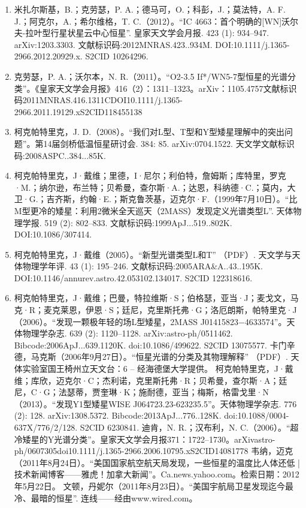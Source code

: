 \begin{enumerate}
\item 米扎尔斯基，B.；克劳瑟，P. A.；德马可，O.；科彭，J.；莫法特，A. F. J.；阿克尔，A.；希尔维格，T. C.（2012）。“IC 4663：首个明确的[WN]沃尔夫-拉叶型行星状星云中心恒星”. 皇家天文学会月报. 423 (1): 934–947. arXiv:1203.3303. 文献标识码:2012MNRAS.423..934M. DOI:10.1111/j.1365-2966.2012.20929.x. S2CID 10264296.
\item 克劳瑟，P. A.；沃尔本，N. R.（2011）。“O2-3.5 If*/WN5-7型恒星的光谱分类”。《皇家天文学会月报》416（2）：1311–1323。arXiv：1105.4757文献标识码2011MNRAS.416.1311CDOI10.1111/j.1365-2966.2011.19129.xS2CID118455138
\item 柯克帕特里克，J. D.（2008）。“我们对L型、T型和Y型矮星理解中的突出问题”。第14届剑桥低温恒星研讨会. 384: 85. arXiv:0704.1522. 天文学文献标识码:2008ASPC..384...85K.
\item 柯克帕特里克，J·戴维；里德，I·尼尔；利伯特，詹姆斯；库特里，罗克·M.；纳尔逊，布兰特；贝希曼，查尔斯·A.；达恩，科纳德·C.；莫内，大卫·G.；吉齐斯，约翰·E.；斯克鲁茨基，迈克尔·F.（1999年7月10日）。“比M型更冷的矮星：利用2微米全天巡天（2MASS）发现定义光谱类型L”. 天体物理学报. 519 (2): 802–833. 文献标识码:1999ApJ...519..802K. DOI:10.1086/307414.
\item 柯克帕特里克，J·戴维（2005）。“新型光谱类型L和T” （PDF）. 天文学与天体物理学年评. 43 (1): 195–246. 文献标识码:2005ARA&A..43..195K. DOI:10.1146/annurev.astro.42.053102.134017. S2CID 122318616.
\item 柯克帕特里克，J·戴维；巴曼，特拉维斯·S；伯格瑟，亚当·J；麦戈文，马克·R；麦克莱恩，伊恩·S；廷尼，克里斯托弗·G；洛厄朗斯，帕特里克·J（2006）。“发现一颗极年轻的场L型矮星，2MASS J01415823−4633574”。天体物理学杂志. 639 (2): 1120–1128. arXiv:astro-ph/0511462. Bibcode:2006ApJ...639.1120K. doi:10.1086/499622. S2CID 13075577.
 卡门辛德，马克斯（2006年9月27日）。“恒星光谱的分类及其物理解释” （PDF）. 天体实验室国王椅州立天文台：6 – 经海德堡大学提供。
 柯克帕特里克，J·戴维；库欣，迈克尔·C；杰利诺，克里斯托弗·R；贝希曼，查尔斯·A；廷尼，C·G；法瑟蒂，贾奎琳·K；施耐德，亚当；梅斯，格雷戈里·N（2013）。“发现Y1型矮星WISE J064723.23-623235.5”。天体物理学杂志. 776 (2): 128. arXiv:1308.5372. Bibcode:2013ApJ...776..128K. doi:10.1088/0004-637X/776/2/128. S2CID 6230841.
 迪肯，N. R.；汉布利，N. C.（2006）。“超冷矮星的Y光谱分类”。皇家天文学会月报371：1722–1730。arXivastro-ph/0607305doi10.1111/j.1365-2966.2006.10795.xS2CID14081778
 韦纳，迈克（2011年8月24日）。“美国国家航空航天局发现，一些恒星的温度比人体还低 | 技术新闻博客——雅虎！加拿大新闻”。Ca.news.yahoo.com。检索日期：2012年5月22日。
 文顿，丹妮尔（2011年8月23日）。“美国宇航局卫星发现迄今最冷、最暗的恒星”. 连线——经由www.wired.com。

\end{enumerate}
